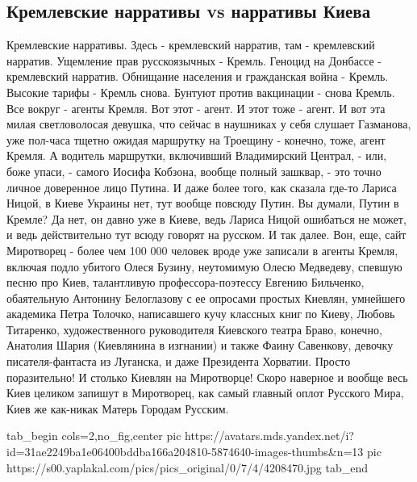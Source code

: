  
 
 
 
 

\subsection{Кремлевские нарративы vs нарративы Киева}

Кремлевские нарративы. Здесь - кремлевский нарратив, там - кремлевский
нарратив. Ущемление прав русскоязычных - Кремль. Геноцид на Донбассе -
кремлевский нарратив. Обнищание населения и гражданская война - Кремль. Высокие
тарифы - Кремль снова. Бунтуют против вакцинации - снова Кремль.  Все вокруг -
агенты Кремля. Вот этот - агент. И этот тоже - агент. И вот эта милая
светловолосая девушка, что сейчас в наушниках у себя слушает Газманова, уже
пол-часа тщетно ожидая маршрутку на Троещину - конечно, тоже, агент Кремля. А
водитель маршрутки, включивший Владимирский Централ, - или, боже упаси, -
самого Иосифа Кобзона, вообще полный зашквар, - это точно личное доверенное
лицо Путина. И даже более того, как сказала где-то Лариса Ницой, в Киеве
Украины нет, тут вообще повсюду Путин. Вы думали, Путин в Кремле? Да нет, он
давно уже в Киеве, ведь Лариса Ницой ошибаться не может, и ведь действительно
тут всюду говорят на русском. И так далее. Вон, еще, сайт Миротворец - более
чем 100 000  человек вроде уже записали в агенты Кремля, включая подло убитого
Олеся Бузину, неутомимую Олесю Медведеву, спевшую песню про Киев, талантливую
профессора-поэтессу Евгению Бильченко, обаятельную Антонину Белоглазову с ее
опросами простых Киевлян, умнейшего академика Петра Толочко, написавшего кучу
классных книг по Киеву, Любовь Титаренко, художественного руководителя
Киевского театра Браво, конечно, Анатолия Шария (Киевлянина в изгнании) и также
Фаину Савенкову, девочку писателя-фантаста из Луганска, и даже Президента
Хорватии. Просто поразительно! И столько Киевлян на Миротворце! Скоро наверное
и вообще весь Киев целиком запишут в Миротворец, как самый главный оплот
Русского Мира, Киев же как-никак Матерь Городам Русским.

\ifcmt
  tab_begin cols=2,no_fig,center
     pic https://avatars.mds.yandex.net/i?id=31ae2249ba1e06400bddba166a204810-5874640-images-thumbs&n=13
		 pic https://s00.yaplakal.com/pics/pics_original/0/7/4/4208470.jpg
  tab_end
\fi

